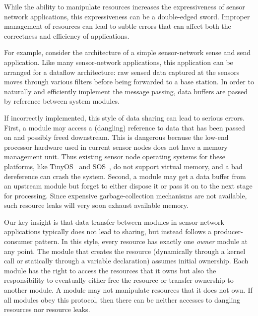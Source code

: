 While the ability to manipulate resources increases the expressiveness
of sensor network applications, this expressiveness can be a
double-edged sword.  Improper management of resources can lead to
subtle errors that can affect both the correctness and efficiency of
applications.

For example, consider the architecture of a simple sensor-network
sense and send application.
Like many sensor-network applications, this application can be
arranged for a dataflow architecture:  raw sensed data captured at the
sensors moves through various filters
before being forwarded to a base station.
In order to naturally and efficiently implement the message passing,
data buffers are 
passed by
reference between system modules.

If incorrectly implemented, this style of data sharing can lead to
serious errors.  First, a module may access a (dangling) reference to
data that has been passed on and possibly freed downstream. 
%
This is dangerous because
%
the low-end processor hardware used in current sensor nodes does not
have a memory management unit.  Thus existing sensor node operating
systems for these platforms, like TinyOS~\cite{TinyOS} and
SOS~\cite{sos}, do not support virtual memory, and a bad dereference
can crash the system. 
%
Second, a module may get a data buffer from an upstream module but
forget to either dispose it or pass it on to the next stage for
processing.  Since expensive garbage-collection mechanisms are not
available, such resource leaks will very soon exhaust available
memory.


Our key insight is that data transfer between
modules in sensor-network applications 
typically does not lead to sharing, but instead follows a
producer-consumer pattern.  
In this style,
every resource has exactly one {\em owner} module at any point.  The
module that creates the resource (dynamically 
through a kernel call or statically
through a variable declaration) assumes initial ownership.
Each module has the right to access the resources that it owns but
also the responsibility to eventually either free the resource or transfer
ownership to another module.  
%
A module may not manipulate resources that it does not own.  If all
modules obey this protocol, then there can be neither accesses to
dangling resources nor resource leaks.



